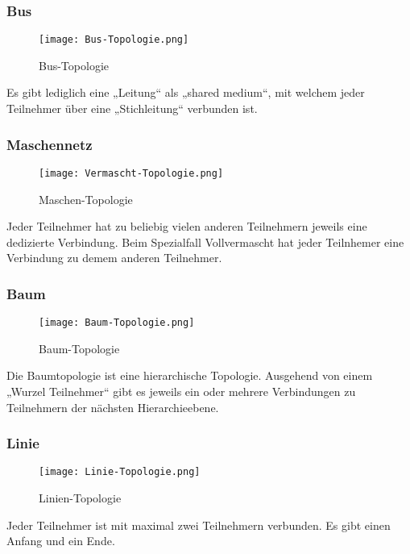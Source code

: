 \subsubsection{Bus}
\begin{figure}[htbp]
  \centering
  \texttt{[image: Bus-Topologie.png]}
  \caption{Bus-Topologie}
\end{figure}
Es gibt lediglich eine „Leitung“ als „shared medium“, mit welchem jeder Teilnehmer über eine „Stichleitung“ verbunden ist.

\subsubsection{Maschennetz}
\begin{figure}[htbp]
  \centering
  \texttt{[image: Vermascht-Topologie.png]}
  \caption{Maschen-Topologie}
\end{figure}
Jeder Teilnehmer hat zu beliebig vielen anderen Teilnehmern jeweils eine dedizierte Verbindung. Beim Spezialfall Vollvermascht hat jeder Teilnhemer eine Verbindung zu demem anderen Teilnehmer.

\subsubsection{Baum}
\begin{figure}[htbp]
  \centering
  \texttt{[image: Baum-Topologie.png]}
  \caption{Baum-Topologie}
\end{figure}
Die Baumtopologie ist eine hierarchische Topologie. Ausgehend von einem „Wurzel Teilnehmer“ gibt es jeweils ein oder mehrere Verbindungen zu Teilnehmern der nächsten Hierarchieebene.

\subsubsection{Linie}
\begin{figure}[htbp]
  \centering
  \texttt{[image: Linie-Topologie.png]}
  \caption{Linien-Topologie}
\end{figure}
Jeder Teilnehmer ist mit maximal zwei Teilnehmern verbunden. Es gibt einen Anfang und ein Ende.



